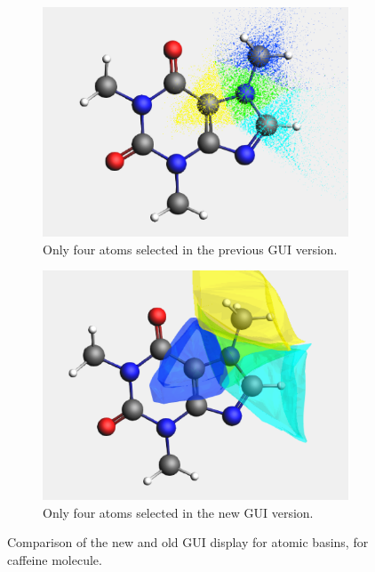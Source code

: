 \begin{figure}[h!]
  \begin{subfigure}[t]{0.48\textwidth}
    \centering
    \includegraphics[width=\linewidth]{gui_ss/oldSelected2.png}
    \caption{Only four atoms selected in the previous \gls{GUI} version.}
  \end{subfigure}
  \begin{subfigure}[t]{0.48\textwidth}
    \centering
    \includegraphics[width=\linewidth]{gui_ss/newSelected2.png}
    \caption{Only four atoms selected in the new \gls{GUI} version.}
  \end{subfigure}
  \caption{Comparison of the new and old \gls{GUI} display for atomic basins, for
    caffeine molecule.}
  \label{gui_atomic_basin}
\end{figure}

